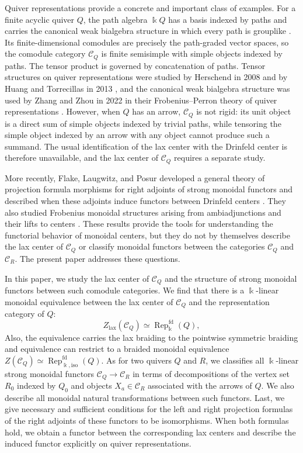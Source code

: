\documentclass{amsart}
\theoremstyle{definition}
\theoremstyle{remark}
\numberwithin{equation}{section}
\begin{document}
Quiver representations provide a concrete and important class of examples. For
a finite acyclic quiver $Q$, the path algebra $\Bbbk Q$ has a basis indexed by
paths and carries the canonical weak bialgebra structure in which every path is
grouplike \cite[Lemma~2.1(1)]{ZZ2022}. Its finite-dimensional comodules are
precisely the path-graded vector spaces, so the comodule category
$\mathcal C_Q$ is finite semisimple with simple objects indexed by paths. The
tensor product is governed by concatenation of paths. Tensor structures on
quiver representations were studied by Herschend in 2008 and by Huang and
Torrecillas in 2013 \cite{H2008,HT2013}, and the canonical weak bialgebra
structure was used by Zhang and Zhou in 2022 in their Frobenius--Perron theory
of quiver representations \cite{ZZ2022}. However, when $Q$ has an arrow,
$\mathcal C_Q$ is not rigid: its unit object is a direct sum of simple objects
indexed by trivial paths, while tensoring the simple object indexed by an arrow
with any object cannot produce such a summand. The usual identification of the
lax center with the Drinfeld center is therefore unavailable, and the lax center
of $\mathcal C_Q$ requires a separate study.

More recently, Flake, Laugwitz, and Posur developed a general theory of
projection formula morphisms for right adjoints of strong monoidal functors and
described when these adjoints induce functors between Drinfeld centers
\cite{flake2026projection}. They also studied Frobenius monoidal structures arising from
ambiadjunctions and their lifts to centers \cite{FLP2025}. These results provide
the tools for understanding the functorial behavior of monoidal centers, but
they do not by themselves describe the lax center of $\mathcal C_Q$ or classify
monoidal functors between the categories $\mathcal C_Q$ and $\mathcal C_R$. The
present paper addresses these questions.

In this paper, we study the lax center of $\mathcal C_Q$ and the structure of
strong monoidal functors between such comodule categories. We find that there is a $\Bbbk$-linear monoidal equivalence between the lax center of $\mathcal C_Q$ and 
the representation category of $Q$:
\[
Z_{\mathrm{lax}}(\mathcal C_Q)
\simeq
\operatorname{Rep}^{\mathrm{fd}}_{\Bbbk}(Q),
\]
Also, the equivalence carries the lax braiding to the pointwise symmetric braiding and 
equivalence can restrict to a braided monoidal equivalence
$Z(\mathcal C_Q)\simeq
\operatorname{Rep}^{\mathrm{fd}}_{\Bbbk,\mathrm{iso}}(Q)$.
As for two quivers $Q$ and $R$, we classifies all $\Bbbk$-linear strong monoidal functors
$\mathcal C_Q\to\mathcal C_R$ in terms of decompositions of the vertex set
$R_0$ indexed by $Q_0$ and objects $X_a\in\mathcal C_R$ associated with the
arrows of $Q$. We also describe all monoidal natural transformations between
such functors. Last, we give necessary and sufficient conditions
for the left and right projection formulas of the right adjoints of these
functors to be isomorphisms. When both formulas hold, we obtain a functor
between the corresponding lax centers and describe the induced functor
explicitly on quiver representations.
\end{document}
